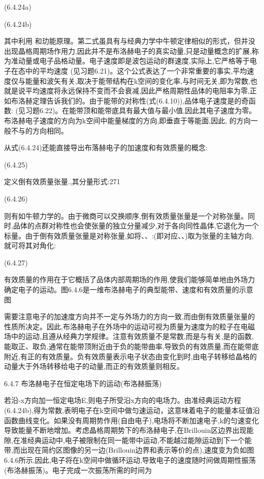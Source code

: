  	(6.4.24a)

	 (6.4.24b)

	其中利用 和玏能原理。第二式虽具有与经典力学中牛顿定律相似的形式，但并没出现晶格周期场作用力,因此并不是布洛赫电子的真实动量,只是动量概念的扩展,称为准动量或电子品格动量。电子速度即是波包运动的群速度,实际上,它严格等于电子在态中的平均速度 (见习题6.21)。这个公式表达了一个非常重要的事实,平均速度仅与能量和波矢有关,取决于能带结构在k空间的变化率,与时间无关,即为常数,也就是说平均速度将永远保持不变而不会衰减,因此严格周期性品体的电阻率为零,正如布洛赫定理告诉我们的。由于能带的对称性(式(6.4.10)),品体电子速度是的奇函数:  (见习题6.22)。在能带顶和能带底具有最大值与最小值,因此其电子速度为零。布洛赫电子速度的方向为k空间中能量梯度的方向,即垂直于等能面,因此, 的方向一般不与的方向相同。

从式(6.4.24)还能直接导出布落赫电子的加速度和有效质量的概念:

 	(6.4.25)

定义倒有效质量张量.,其分量形式:271

 (6.4.26)

则有如牛顿力学的。由于微商可以交换顺序,倒有效质量张量是一个对称张量。同时,品体的点群对称性也会使张量的独立分量减少,对于各向同性晶体,它退化为一个标量。由于倒有效质量张量是对称张量,如将、、:(即对应、、)取为张量的主轴方向,就可将其对角化:

 	(6.4.27)

有效质量的作用在于它概括了品体内部周期场的作用,使我们能够简单地由外场力确定电子的运动。图6.4.6是一维布洛赫电子的典型能带、速度和有效质量的示意图



需要注意电子的加速度方向并不一定与外场力的方向一致,而由倒有效质量张量的性质所决定。因此,布洛赫电子在外场中的运动可视为质量为速度为的粒子在电磁场中的运动,且遵从经典力学规律。注意有效质量不是常数,而是与有关,是的函数,能取正、取负,通常在能带顶附近由于负的能带曲率,导致负的有效质量,而在能带底附近,有正的有效质量。负有效质量表示电子状态由变化到时,由电子转移给晶格的动量大于外场转移给电子的动量,而正的有效质量则相反。

6.4.7 布洛赫电子在恒定电场下的运动(布洛赫振荡)

若沿-x方向加一恒定电场E,则电子所受沿x方向的电场力。由准经典运动方程(6.4.24b),得为常数,表明电子在k空间中做匀速运动，这意味着电子的能量本征值沿函数曲线变化。如果没有周期势作用(自由电子),电场将不断加速电子,k的匀速变化导致能量不断地增加。考虑晶格周期势下的布洛赫电子,在Brillouin区边界出现能隙,在准经典运动中,电子被限制在同一能带中运动,不能越过能隙运动到下一个能带,而出现在简约区图像的另一边(Brillouin边界和表示等价的点),速度变为负如图6.4.6所示,因此,电子将在k空间中做循环运动,导致电子的速度随时间做周期性振荡(布洛赫振荡)。电子完成一次振荡所需的时间为

